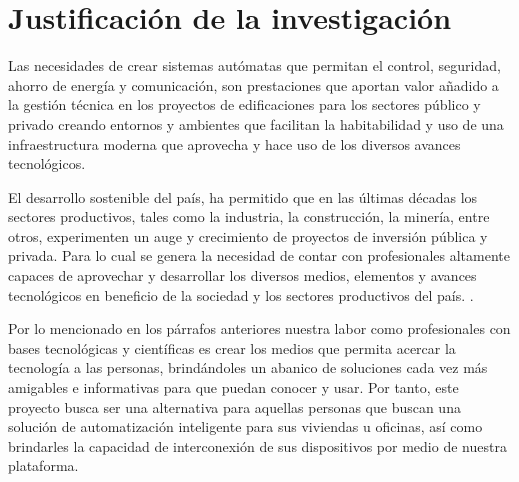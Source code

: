 \newcommand{\keyword}[1]{\textbf{#1}}
\newcommand{\tabhead}[1]{\textbf{#1}}
\newcommand{\code}[1]{\texttt{#1}}
\newcommand{\file}[1]{\texttt{\bfseries#1}}
\newcommand{\option}[1]{\texttt{\itshape#1}}
\newcommand{\grados}{$^{\circ}$}





\vspace{5.0cm}

\section{Justificación de la investigación}

Las necesidades de crear sistemas autómatas que permitan el control, seguridad, ahorro de energía y comunicación, son prestaciones que aportan valor añadido a la gestión técnica en los proyectos de edificaciones para los sectores público y privado creando entornos y ambientes que facilitan la habitabilidad y uso de una infraestructura moderna que aprovecha y hace uso de los diversos avances tecnológicos.

El desarrollo sostenible del país, ha permitido que en las últimas décadas los sectores productivos, tales como la industria, la construcción, la minería, entre otros, experimenten un auge y crecimiento de proyectos de inversión pública y privada. Para lo cual se genera la necesidad de contar con profesionales altamente capaces de aprovechar y desarrollar los diversos medios, elementos y avances tecnológicos en beneficio de la sociedad y los sectores productivos del país. \citep{ARTICLE:2}.

Por lo mencionado en los párrafos anteriores nuestra labor como profesionales con bases tecnológicas y científicas es crear los medios que permita acercar la tecnología a las personas, brindándoles un abanico de soluciones cada vez más amigables e informativas para que puedan conocer y usar. Por tanto, este proyecto busca ser una alternativa para aquellas personas que buscan una solución de automatización inteligente para sus viviendas u oficinas, así como brindarles la capacidad de interconexión de sus dispositivos por medio de nuestra plataforma.

